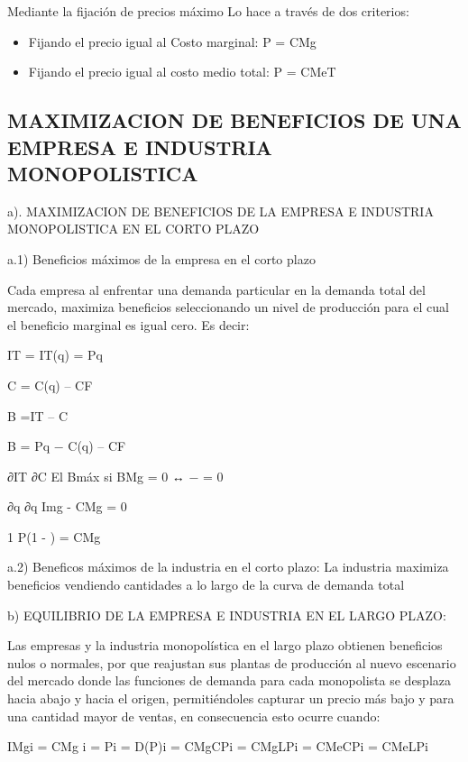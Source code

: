 \documentclass[
  letterpaper,
  DIV=11,
  numbers=noendperiod]{scrartcl}
\begin{document}
Mediante la fijación de precios máximo Lo hace a través de dos
criterios:

\begin{itemize}
\item
  Fijando el precio igual al Costo marginal: P = CMg
\item
  Fijando el precio igual al costo medio total: P = CMeT
\end{itemize}

\hypertarget{maximizacion-de-beneficios-de-una-empresa-e-industria-monopolistica}{%
\subsection{MAXIMIZACION DE BENEFICIOS DE UNA EMPRESA E INDUSTRIA
MONOPOLISTICA}\label{maximizacion-de-beneficios-de-una-empresa-e-industria-monopolistica}}

a). MAXIMIZACION DE BENEFICIOS DE LA EMPRESA E INDUSTRIA MONOPOLISTICA
EN EL CORTO PLAZO

a.1) Beneficios máximos de la empresa en el corto plazo

Cada empresa al enfrentar una demanda particular en la demanda total del
mercado, maximiza beneficios seleccionando un nivel de producción para
el cual el beneficio marginal es igual cero. Es decir:

IT = IT(q) = Pq

C = C(q) -- CF

B =IT -- C

B = Pq − C(q) -- CF

∂IT ∂C El Bmáx si BMg = 0 ↔ − = 0

∂q ∂q Img - CMg = 0

1 P(1 - ) = CMg

a.2) Beneficos máximos de la industria en el corto plazo: La industria
maximiza beneficios vendiendo cantidades a lo largo de la curva de
demanda total

b) EQUILIBRIO DE LA EMPRESA E INDUSTRIA EN EL LARGO PLAZO:

Las empresas y la industria monopolística en el largo plazo obtienen
beneficios nulos o normales, por que reajustan sus plantas de producción
al nuevo escenario del mercado donde las funciones de demanda para cada
monopolista se desplaza hacia abajo y hacia el origen, permitiéndoles
capturar un precio más bajo y para una cantidad mayor de ventas, en
consecuencia esto ocurre cuando:

IMgi = CMg i = Pi = D(P)i = CMgCPi = CMgLPi = CMeCPi = CMeLPi
\end{document}
